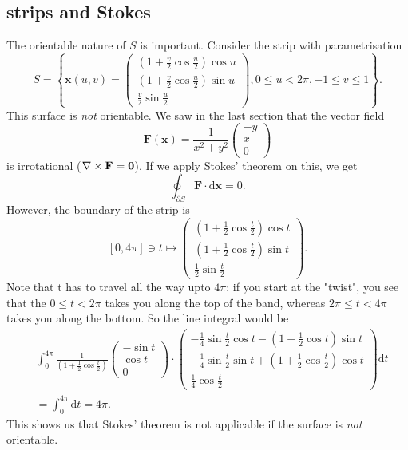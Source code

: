 \subsection{\mobius strips and Stokes}
The orientable nature of $S$ is important. Consider the \mobius strip with parametrisation
\[
    S=\left\{\mathbf{x}(u, v)=\begin{pmatrix}
        \left(1+\frac{v}{2} \cos \frac{u}{2}\right) \cos u \\[5pt]
        \left(1+\frac{v}{2} \cos \frac{u}{2}\right) \sin u \\[5pt]
        \frac{v}{2} \sin \frac{u}{2}
    \end{pmatrix}, 0 \leq u<2 \pi,-1 \leq v \leq 1\right\}.
\]
This surface is \textit{not} orientable. We saw in the last section that the vector field
\[
    \mathbf{F}(\mathbf{x}) = \frac{1}{x^2+y^2}\begin{pmatrix}
        -y \\ x \\ 0
    \end{pmatrix}
\]
is irrotational ($ \nabla\times \mathbf{F} = \mathbf{0} $). If we apply Stokes' theorem on this, we get 
\[
    \oint_{\partial S} \mathbf{F} \cdot \mathrm{d}\mathbf{x}=0.
\]
However, the boundary of the \mobius strip is 
\[
    [0,4 \pi] \ni t \mapsto \begin{pmatrix}
        \left(1+\frac{1}{2} \cos \frac{t}{2}\right) \cos t \\[5pt]
        \left(1+\frac{1}{2} \cos \frac{t}{2}\right) \sin t \\[5pt]
        \frac{1}{2} \sin \frac{t}{2}
    \end{pmatrix}.
\]
Note that t has to travel all the way upto $4 \pi$: if you start at the "twist", you see that the
$0 \leq t<2 \pi$ takes you along the top of the band, whereas $2 \pi \leq t<4 \pi$ takes you along the bottom. So the line integral would be 
\begin{align*}
    &\int_{0}^{4 \pi} \frac{1}{\left(1+\frac{1}{2} \cos \frac{t}{2}\right)}\begin{pmatrix}
        -\sin t \\ \cos t \\ 0
    \end{pmatrix} \cdot \begin{pmatrix}
        -\frac{1}{4} \sin \frac{t}{2} \cos t-\left(1+\frac{1}{2} \cos t\right) \sin t \\[5pt]
        -\frac{1}{4} \sin \frac{t}{2} \sin t+\left(1+\frac{1}{2} \cos \frac{t}{2}\right) \cos t \\[5pt]
        \frac{1}{4} \cos \frac{t}{2}
    \end{pmatrix} \mathrm{d} t\\
    &=\int_{0}^{4 \pi} \mathrm{d} t=4 \pi.
\end{align*}
This shows us that Stokes' theorem is not applicable if the surface is \textit{not} orientable.

